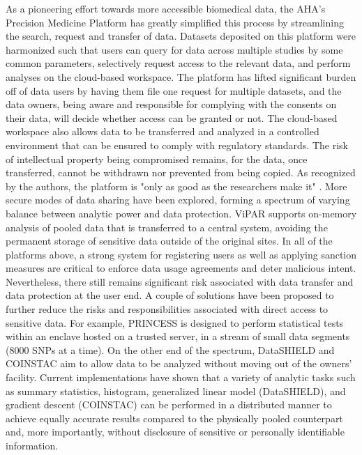 \documentclass[letter]{bib}
\newcounter{example}[subsection]
\begin{document}
	As a pioneering effort towards more accessible biomedical data, the AHA's Precision Medicine Platform \citep{Kass-Hout:2018:American} has greatly simplified this process by streamlining the search, request and transfer of data. Datasets deposited on this platform were harmonized such that users can query for data across multiple studies by some common parameters, selectively request access to the relevant data, and perform analyses on the cloud-based workspace. The platform has lifted significant burden off of data users by having them file one request for multiple datasets, and the data owners, being aware and responsible for complying with the consents on their data, will decide whether access can be granted or not. The cloud-based workspace also allows data to be transferred and analyzed in a controlled environment that can be ensured to comply with regulatory standards. The risk of intellectual property being compromised remains, for the data, once transferred, cannot be withdrawn nor prevented from being copied. As recognized by the authors, the platform is "only as good as the researchers make it" \citep{Kass-Hout:2018:American}.
	More secure modes of data sharing have been explored, forming a spectrum of varying balance between analytic power and data protection. ViPAR \citep{Carter:2016:ViPAR} supports on-memory analysis of pooled data that is transferred to a central system, avoiding the permanent storage of sensitive data outside of the original sites.  In all of the platforms above, a strong system for registering users as well as applying sanction measures are critical to enforce data usage agreements and deter malicious intent. Nevertheless, there still remains significant risk associated with data transfer and data protection at the user end.
	A couple of solutions have been proposed to further reduce the risks and responsibilities associated with direct access to sensitive data. For example, PRINCESS \citep{Chen:2017:PRINCESS} is designed to perform statistical tests within an enclave hosted on a trusted server, in a stream of small data segments (8000 SNPs at a time). On the other end of the spectrum, DataSHIELD \citep{Gaye:2014:DataSHIELD, Wilson:2017:DataSHIELD} and COINSTAC \citep{Plis:2016:COINSTAC} aim to allow data to be analyzed without moving out of the owners' facility. Current implementations have shown that a variety of analytic tasks such as summary statistics, histogram, generalized linear model (DataSHIELD), and gradient descent (COINSTAC) can be performed in a distributed manner to achieve equally accurate results compared to the physically pooled counterpart and, more importantly, without disclosure of sensitive or personally identifiable information.
	
\end{document}
